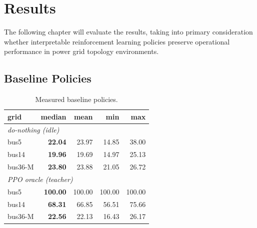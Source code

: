 \chapter{Results}
\label{ch:Results}

The following chapter will evaluate the results, taking into primary consideration whether interpretable reinforcement learning policies preserve operational performance in power grid topology environments.

\section{Baseline Policies}
\label{sec:baselines}

\begin{table}[H]
\centering
\small
\begin{tabular}{lrrrr}
\toprule
grid & median & mean & min & max \\
\midrule
\multicolumn{5}{l}{\textit{do-nothing (idle)}} \\
bus5    & \textbf{22.04}  & 23.97  & 14.85  & 38.00 \\
bus14   & \textbf{19.96}  & 19.69  & 14.97  & 25.13 \\
bus36-M & \textbf{23.80}  & 23.88  & 21.05  & 26.72 \\
\midrule
\multicolumn{5}{l}{\textit{PPO oracle (teacher)}} \\
bus5    & \textbf{100.00} & 100.00 & 100.00 & 100.00 \\
bus14   & \textbf{68.31}  & 66.85  & 56.51  & 75.66 \\
bus36-M & \textbf{22.56}  & 22.13  & 16.43  & 26.17 \\
\bottomrule
\end{tabular}
\caption{Measured baseline policies.}
\label{tab:baselines}
\end{table}

